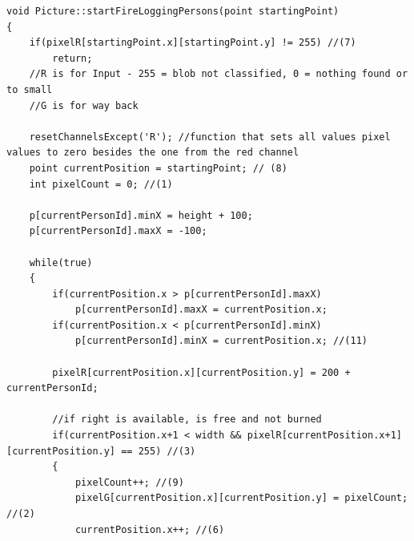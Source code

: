 \begin{lstlisting}
void Picture::startFireLoggingPersons(point startingPoint)
{
	if(pixelR[startingPoint.x][startingPoint.y] != 255) //(7)
		return;
	//R is for Input - 255 = blob not classified, 0 = nothing found or to small
	//G is for way back

	resetChannelsExcept('R'); //function that sets all values pixel values to zero besides the one from the red channel
	point currentPosition = startingPoint; // (8)
	int pixelCount = 0; //(1)

	p[currentPersonId].minX = height + 100;
	p[currentPersonId].maxX = -100;
	
	while(true)
	{
		if(currentPosition.x > p[currentPersonId].maxX)
			p[currentPersonId].maxX = currentPosition.x;
		if(currentPosition.x < p[currentPersonId].minX)
			p[currentPersonId].minX = currentPosition.x; //(11)
					
		pixelR[currentPosition.x][currentPosition.y] = 200 + currentPersonId;

		//if right is available, is free and not burned
		if(currentPosition.x+1 < width && pixelR[currentPosition.x+1][currentPosition.y] == 255) //(3)
		{
			pixelCount++; //(9)
			pixelG[currentPosition.x][currentPosition.y] = pixelCount; //(2)
			currentPosition.x++; //(6)


\end{lstlisting}
